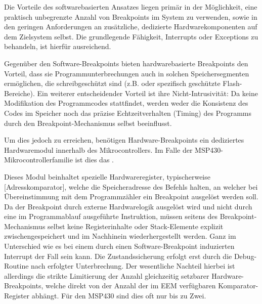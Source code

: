 Die Vorteile des softwarebasierten Ansatzes liegen prim\"ar in der M\"oglichkeit, eine praktisch unbegrenzte Anzahl von Breakpoints im System zu verwenden, sowie in den geringen Anforderungen an zus\"atzliche, dedizierte Hardwarekomponenten auf dem Zielsystem selbst. Die grundlegende F\"ahigkeit, Interrupts oder Exceptions zu behandeln, ist hierf\"ur ausreichend. 

Gegen\"uber den Software-Breakpoints bieten hardwarebasierte Breakpoints den Vorteil, dass sie Programmunterbrechungen auch in solchen Speichersegmenten erm\"oglichen, die schreibgesch\"utzt sind (z.B.  oder spezifisch gesch\"utzte Flash-Bereiche). Ein weiterer entscheidender Vorteil ist ihre Nicht-Intrusivit\"at: Da keine Modifikation des Programmcodes stattfindet, werden weder die Konsistenz des Codes im Speicher noch das pr\"azise Echtzeitverhalten (Timing) des Programms durch den Breakpoint-Mechanismus selbst beeinflusst. 

\newpage
Um dies jedoch zu erreichen, ben\"otigen Hardware-Breakpoints ein dediziertes Hardwaremodul innerhalb des Mikrocontrollers. Im Falle der MSP430-Mikrocontrollerfamilie ist dies das .  

Dieses Modul beinhaltet spezielle Hardwareregister, typischerweise [Adresskomparator], welche die Speicheradresse des Befehls halten, an welcher bei \"Ubereinstimmung mit dem Programmz\"ahler ein Breakpoint ausgel\"ost werden soll. Da der Breakpoint durch externe Hardwarelogik ausgel\"ost wird und nicht durch eine im Programmablauf ausgef\"uhrte Instruktion, m\"ussen seitens des Breakpoint-Mechanismus selbst keine Registerinhalte oder Stack-Elemente explizit zwischengespeichert und im Nachhinein wiederhergestellt werden. Ganz im Unterschied wie es bei einem durch einen Software-Breakpoint induzierten Interrupt der Fall sein kann. Die Zustandssicherung erfolgt erst durch die Debug-Routine nach erfolgter Unterbrechung. Der wesentliche Nachteil hierbei ist allerdings die strikte Limitierung der Anzahl gleichzeitig setzbarer Hardware-Breakpoints, welche direkt von der Anzahl der im EEM verf\"ugbaren Komparator-Register abh\"angt. F\"ur den MSP430 sind dies oft nur bis zu Zwei. 

